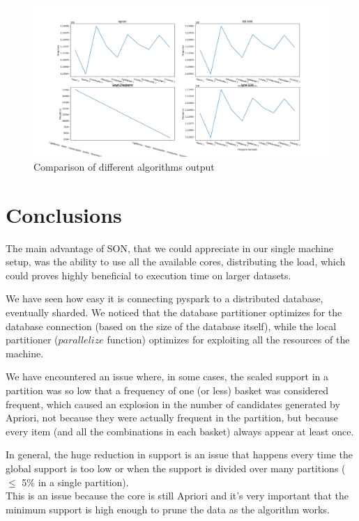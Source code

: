 \documentclass[a4paper]{article}
\begin{document}
	\begin{figure}[h]
			\centering
			\includegraphics[width=\textwidth]{result_example.png}
         	\caption{Comparison of different algorithms output}
		\label{fig:result-example}
	\end{figure}
	
	\section{Conclusions}
	\label{section:conclusion}
	The main advantage of SON, that we could appreciate in our single machine setup, was the ability to use all the available cores, distributing the load, which could proves highly beneficial to execution time on larger datasets.

	We have seen how easy it is connecting pyspark to a distributed database, eventually sharded.	
	We noticed that the database partitioner optimizes for the database connection (based on the size of the database itself), 
	while the local partitioner ($parallelize$ function) optimizes for exploiting all the resources of the machine.
	
	We have encountered an issue where, in some cases, the scaled support in a partition was so low that a frequency of one (or less) basket was considered frequent, 
	which caused an explosion in the number of candidates generated by Apriori, not because they were actually frequent in the partition, but 
	because every item (and all the combinations in each basket) always appear at least once. 

	In general, the huge reduction in support is an issue that happens every time the global support is too low or when the support is divided over many partitions ($\leq$ 5\% in a single partition).\\
	This is an issue because the core is still Apriori and it's very important that the minimum support is high enough to prune the data as the algorithm works.
\end{document}
